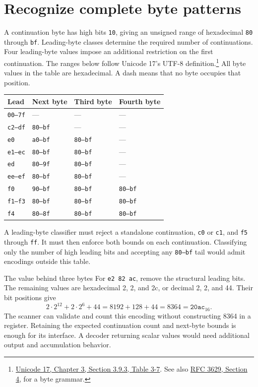 \section{Recognize complete byte patterns}
A continuation byte has high bits \texttt{10}, giving an unsigned range of
hexadecimal \texttt{80} through \texttt{bf}. Leading-byte classes determine the
required number of continuations. Four leading-byte values impose an additional
restriction on the first continuation. The ranges below follow Unicode 17's
UTF-8 definition.\footnote{\href{https://www.unicode.org/versions/Unicode17.0.0/core-spec/chapter-3/}{Unicode 17, Chapter 3, Section 3.9.3, Table 3-7}. See also \href{https://www.rfc-editor.org/rfc/rfc3629}{RFC 3629, Section 4}, for a byte grammar.}
All byte values in the table are hexadecimal. A dash means that no byte occupies
that position.

\begin{longtable}{llll}
  \toprule Lead   & Next byte       & Third byte      & Fourth byte     \\\midrule
  \texttt{00--7f} & ---             & ---             & ---             \\
  \texttt{c2--df} & \texttt{80--bf} & ---             & ---             \\
  \texttt{e0}     & \texttt{a0--bf} & \texttt{80--bf} & ---             \\
  \texttt{e1--ec} & \texttt{80--bf} & \texttt{80--bf} & ---             \\
  \texttt{ed}     & \texttt{80--9f} & \texttt{80--bf} & ---             \\
  \texttt{ee--ef} & \texttt{80--bf} & \texttt{80--bf} & ---             \\
  \texttt{f0}     & \texttt{90--bf} & \texttt{80--bf} & \texttt{80--bf} \\
  \texttt{f1--f3} & \texttt{80--bf} & \texttt{80--bf} & \texttt{80--bf} \\
  \texttt{f4}     & \texttt{80--8f} & \texttt{80--bf} & \texttt{80--bf} \\\bottomrule
\end{longtable}
A leading-byte classifier must reject a standalone continuation, \texttt{c0} or
\texttt{c1}, and \texttt{f5} through \texttt{ff}. It must then enforce both bounds
on each continuation. Classifying only the number of high leading bits and accepting
any \texttt{80--bf} tail would admit encodings outside this table.

\begin{MARSWorkedExample}{The value behind three bytes}
  For \texttt{e2 82 ac}, remove the structural leading bits. The remaining values
  are hexadecimal 2, 2, and 2c, or decimal 2, 2, and 44. Their bit positions give
  \[
    2\cdot2^{12}+2\cdot2^6+44
    =8192+128+44=8364=\texttt{20ac}_{16}.
  \]
  The scanner can validate and count this encoding without constructing 8364 in a
  register. Retaining the expected continuation count and next-byte bounds is enough
  for its interface. A decoder returning scalar values would need additional output
  and accumulation behavior.
\end{MARSWorkedExample}
